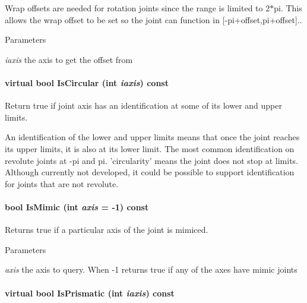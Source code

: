 Wrap offsets are needed for rotation joints since the range is limited to 2$\ast$pi. This allows the wrap offset to be set so the joint can function in \mbox{[}-\/pi+offset,pi+offset\mbox{]}.. 
\begin{DoxyParams}{Parameters}
\item[{\em iaxis}]the axis to get the offset from \end{DoxyParams}
\hypertarget{classOpenRAVE_1_1KinBody_1_1Joint_a7adf99ae40bca7e94d926e3b56321fdb}{
\paragraph[{IsCircular}]{\setlength{\rightskip}{0pt plus 5cm}virtual bool IsCircular (int {\em iaxis}) const}\hfill}
\label{classOpenRAVE_1_1KinBody_1_1Joint_a7adf99ae40bca7e94d926e3b56321fdb}


Return true if joint axis has an identification at some of its lower and upper limits. 

An identification of the lower and upper limits means that once the joint reaches its upper limits, it is also at its lower limit. The most common identification on revolute joints at -\/pi and pi. 'circularity' means the joint does not stop at limits. Although currently not developed, it could be possible to support identification for joints that are not revolute. \hypertarget{classOpenRAVE_1_1KinBody_1_1Joint_ac8d727c6f970d30c4cdea02ce2a153bc}{
\paragraph[{IsMimic}]{\setlength{\rightskip}{0pt plus 5cm}bool IsMimic (int {\em axis} = {\ttfamily -\/1}) const}\hfill}
\label{classOpenRAVE_1_1KinBody_1_1Joint_ac8d727c6f970d30c4cdea02ce2a153bc}


Returns true if a particular axis of the joint is mimiced. 


\begin{DoxyParams}{Parameters}
\item[{\em axis}]the axis to query. When -\/1 returns true if any of the axes have mimic joints \end{DoxyParams}
\hypertarget{classOpenRAVE_1_1KinBody_1_1Joint_a869db68ce6e40c67cc4c5f0f36d1a950}{
\paragraph[{IsPrismatic}]{\setlength{\rightskip}{0pt plus 5cm}virtual bool IsPrismatic (int {\em iaxis}) const}\hfill}
\label{classOpenRAVE_1_1KinBody_1_1Joint_a869db68ce6e40c67cc4c5f0f36d1a950}


